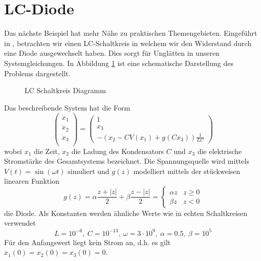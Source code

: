 \section{LC-Diode}\label{sec:expLc}
Das nächste Beispiel hat mehr Nähe zu praktischen Themengebieten. Eingeführt in \cite{boeck2014experiments}, betrachten wir einen LC-Schaltkreis in welchem wir den Widerstand durch eine Diode ausgewechselt haben. Dies sorgt für Unglätten in unseren Systemgleichungen. In Abbildung \ref{fig:lcDiode} ist eine schematische Darstellung des Problems dargestellt. 
\begin{figure}[H]
\centering

\caption{LC Schaltkreis Diagramm}
\label{fig:lcDiode}
\end{figure}
Das beschreibende System hat die Form
\begin{equation}
 \begin{pmatrix}
  \dot x_1\\
  \dot x_2\\
  \dot x_3\\
 \end{pmatrix}
 = 
 \begin{pmatrix}
  1\\
  x_3\\
  -\left(x_2-CV(x_1) + g(Cx_3)\right)\frac{1}{LC}
 \end{pmatrix}
 \label{eq:lcDiodeSystemSimple}
\end{equation}
wobei $x_1$ die Zeit, $x_2$ die Ladung des Kondensators $C$ und $x_3$ die elektrische Stromstärke des Gesamtsystems bezeichnet. Die Spannungsquelle wird mittels $V(t)=\sin(\omega t)$ simuliert und $g(z)$ modelliert mittels der stückweisen linearen Funktion 
\begin{equation}
 g(z) = \alpha\frac{z+|z|}{2} + \beta\frac{z-|z|}{2}  = \begin{cases}
                                                         \alpha z & z\geq 0\\
                                                         \beta z  & z<0
                                                        \end{cases}
\label{eq:lcOde}                                                       
\end{equation}
die Diode. Als Konstanten werden ähnliche Werte wie in echten Schaltkreisen verwendet
\[
 L= 10^{-6},~ C=10^{-13},~ \omega = 3\cdot 10^{9},~\alpha =0.5,~\beta = 10^{5}
\]
Für den Anfangswert liegt kein Strom an, d.h. es gilt $x_1(0)  = x_2(0) = x_3(0) = 0$.

